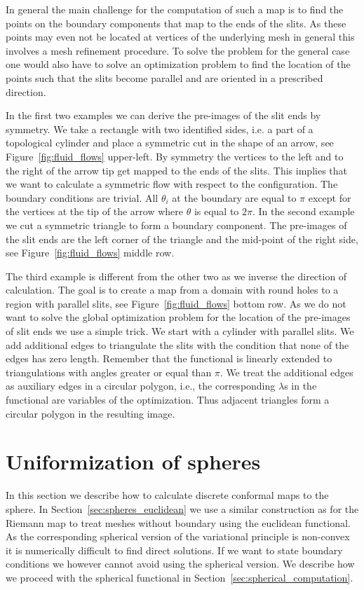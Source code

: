 \documentclass[Thesis]{subfiles}
\begin{document}
In general the main challenge for the computation of such a map is to find the points on the boundary components that map to the ends of the slits. As these points may even not be located at vertices of the underlying mesh in general this involves a mesh refinement procedure. To solve the problem for the general case one would also have to solve an optimization problem to find the location of the points such that the slits become parallel and are oriented in a prescribed direction.

In the first two examples we can derive the pre-images of the slit ends by symmetry. 
We take a rectangle with two identified sides, i.e. a part of a topological cylinder and place a symmetric cut in the shape of an arrow, see Figure~\ref{fig:fluid_flows} upper-left. 
By symmetry the vertices to the left and to the right of the arrow tip get mapped to the ends of the slits. 
This implies that we want to calculate a symmetric flow with respect to the configuration.
The boundary conditions are trivial. 
All $\theta_i$ at the boundary are equal to $\pi$ except for the vertices at the tip of the arrow where $\theta$ is equal to $2\pi$.
In the second example we cut a symmetric triangle to form a boundary component. The pre-images of the slit ends are the left corner of the triangle and the mid-point of the right side, see Figure~\ref{fig:fluid_flows} middle row.

The third example is different from the other two as we inverse the direction of calculation. 
The goal is to create a map from a domain with round holes to a region with parallel slits, see Figure~\ref{fig:fluid_flows} bottom row. 
As we do not want to solve the global optimization problem for the location of the pre-images of slit ends we use a simple trick.
We start with a cylinder with parallel slits.
We add additional edges to triangulate the slits with the condition that none of the edges has zero length.
Remember that the functional is linearly extended to triangulations with angles greater or equal than $\pi$.
We treat the additional edges as auxiliary edges in a circular polygon, i.e., the corresponding $\lambda$s in the functional are variables of the optimization. 
Thus adjacent triangles form a circular polygon in the resulting image.

\section{Uniformization of spheres}
\label{sec:spheres}

In this section we describe how to calculate discrete conformal maps to the sphere.
In Section~\ref{sec:spheres_euclidean} we use a similar construction as for the Riemann map to treat meshes without boundary using the euclidean functional.
As the corresponding spherical version of the variational principle is non-convex it is numerically difficult to find direct solutions.
If we want to state boundary conditions we however cannot avoid using the spherical version.
We describe how we proceed with the spherical functional in Section~\ref{sec:spherical_computation}.
\end{document}
